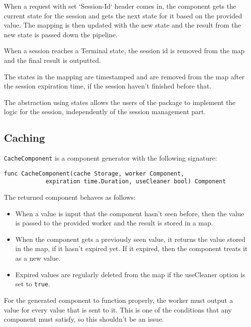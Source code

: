 When a request with set `Session-Id` header comes in, the component gets the current 
state for the session and gets the next state for it based on the provided value.
The mapping is then updated with the new state and the result from the new state
is passed down the pipeline.

When a session reaches a Terminal state, the session id is removed from the map
and the final result is outputted.

The states in the mapping are timestamped and are removed from the map after
the session expiration time, if the session haven't finished before that.

The abstraction using states allows the users of the package to implement the
logic for the session, independently of the session management part.

\subsection{Caching}
\texttt{CacheComponent} is a component generator with the following signature:
\begin{lstlisting}
func CacheComponent(cache Storage, worker Component, 
            expiration time.Duration, useCleaner bool) Component
\end{lstlisting}
The returned component behaves as follows:
\begin{itemize}
	\item When a value is input that the component hasn't seen before, then
		  the value is passed to the provided worker and the result is stored in
		  a map.
	\item When the component gets a previously seen value, it returns the value
		  stored in the map, if it hasn't expired yet. If it expired, then the component
		  treats it as a new value.
	\item Expired values are regularly deleted from the map if the useCleaner
          option is set to \texttt{true}.
\end{itemize}

For the generated component to function properly, the worker must output
a value for every value that is sent to it. This is one of the conditions
that any component must satisfy, so this shouldn't be an issue.

